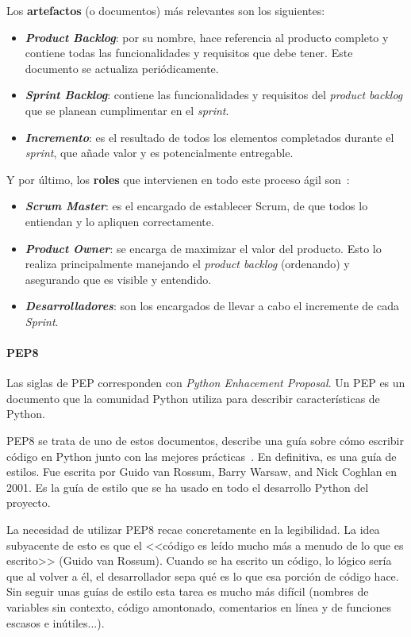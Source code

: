 Los \textbf{artefactos} (o documentos) más relevantes son los siguientes:
\begin{itemize}
	\item \textbf{\textit{Product Backlog}}: por su nombre, hace referencia al
	producto completo y contiene todas las funcionalidades y requisitos que debe
	tener. Este documento se actualiza periódicamente.
	\item \textbf{\textit{Sprint Backlog}}: contiene las funcionalidades y
	requisitos del \textit{product backlog} que se planean cumplimentar en el
	\emph{sprint}.
	\item \textbf{\textit{Incremento}}: es el resultado de todos los elementos
	completados durante el \emph{sprint}, que añade valor y es potencialmente
	entregable.
\end{itemize}

Y por último, los \textbf{roles} que intervienen en todo este proceso ágil son~\cite{scrum:team}:
\begin{itemize}
	\item \textbf{\textit{Scrum Master}}: es el encargado de establecer Scrum,
	de que todos lo entiendan y lo apliquen correctamente.
	\item \textbf{\textit{Product Owner}}: se encarga de maximizar el valor del
	producto. Esto lo realiza principalmente manejando el \textit{product
	backlog} (ordenando) y asegurando que es visible y entendido.
	\item \textbf{\textit{Desarrolladores}}: son los encargados de llevar a cabo
	el incremente de cada \textit{Sprint}.
\end{itemize}


\paragraph{PEP8} Las siglas de PEP corresponden con \textit{Python Enhacement
Proposal}. Un PEP es un documento que la comunidad Python utiliza para describir
características de Python.

PEP8 se trata de uno de estos documentos, describe una guía sobre cómo escribir
código en Python junto con las mejores prácticas~\cite{pep8:desc}. En
definitiva, es una guía de estilos. Fue escrita por Guido van Rossum, Barry
Warsaw, and Nick Coghlan en 2001. Es la guía de estilo que se ha usado en todo
el desarrollo Python del proyecto.

La necesidad de utilizar PEP8 recae concretamente en la legibilidad. La idea
subyacente de esto es que el <<código es leído mucho más a menudo de lo que es
escrito>> (Guido van Rossum). Cuando se ha escrito un código, lo lógico sería
que al volver a él, el desarrollador sepa qué es lo que esa porción de código
hace. Sin seguir unas guías de estilo esta tarea es mucho más difícil (nombres
de variables sin contexto, código amontonado, comentarios en línea y de
funciones escasos e inútiles...).

